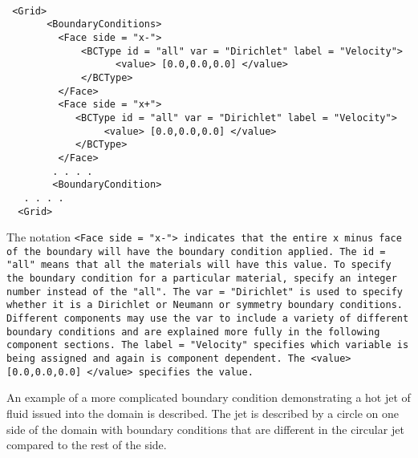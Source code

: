 \begin{Verbatim}[fontsize=\footnotesize]

 <Grid>
       <BoundaryConditions>
         <Face side = "x-">
             <BCType id = "all" var = "Dirichlet" label = "Velocity">
                   <value> [0.0,0.0,0.0] </value>
             </BCType>
         </Face>
         <Face side = "x+">
            <BCType id = "all" var = "Dirichlet" label = "Velocity">
                 <value> [0.0,0.0,0.0] </value>
            </BCType>
         </Face>
        . . . .
        <BoundaryCondition>
   . . . .
  <Grid>

\end{Verbatim}

The notation \tt <Face side = "x-"> \normalfont indicates that the
entire x minus face of the boundary will have the boundary condition
applied.  The \tt id = "all" \normalfont means that all the
materials will have this value.  To specify the boundary condition for
a particular material, specify an integer number instead of the
"all".  The \tt var = "Dirichlet" \normalfont is used to specify
whether it is a Dirichlet or Neumann or symmetry boundary conditions.
Different components may use the \tt var \normalfont to include a
variety of different boundary conditions and are explained more fully
in the following component sections.  The \tt label = "Velocity"
\normalfont specifies which variable is being assigned and again is
component dependent.  The \tt <value> [0.0,0.0,0.0] </value>
\normalfont specifies the value.

An example of a more complicated boundary condition demonstrating a
hot jet of fluid issued into the domain is described.  The jet is
described by a circle on one side of the domain with boundary
conditions that are different in the circular jet compared to the rest
of the side.

